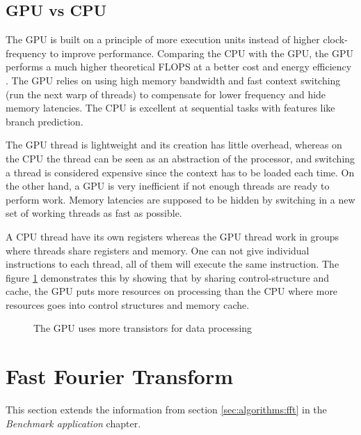 \subsection{GPU vs CPU}

The \gls{GPU} is built on a principle of more execution units instead of higher clock-frequency to improve performance. Comparing the \gls{CPU} with the \gls{GPU}, the \gls{GPU} performs a much higher theoretical \gls{FLOPS} at a better cost and energy efficiency \cite{owens2007survey}. The \gls{GPU} relies on using high memory bandwidth and fast context switching (run the next warp of threads) to compensate for lower frequency and hide memory latencies. The \gls{CPU} is excellent at sequential tasks with features like branch prediction.

The \gls{GPU} thread is lightweight and its creation has little overhead, whereas on the \gls{CPU} the thread can be seen as an abstraction of the processor, and switching a thread is considered expensive since the context has to be loaded each time. On the other hand, a \gls{GPU} is very inefficient if not enough threads are ready to perform work. Memory latencies are supposed to be hidden by switching in a new set of working threads as fast as possible.

A \gls{CPU} thread have its own registers whereas the \gls{GPU} thread work in groups where threads share registers and memory. One can not give individual instructions to each thread, all of them will execute the same instruction. The figure \ref{fig:gpu-vs-cpu} demonstrates this by showing that by sharing control-structure and cache, the \gls{GPU} puts more resources on processing than the \gls{CPU} where more resources goes into control structures and memory cache.

\begin{figure}
	\centering
	
	\caption{The GPU uses more transistors for data processing}
	\label{fig:gpu-vs-cpu}
\end{figure}

\section{Fast Fourier Transform}

This section extends the information from section \ref{sec:algorithms:fft} in the \textit{Benchmark application} chapter.

\subsection{\CTALG}


